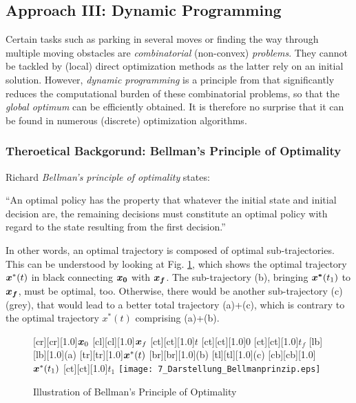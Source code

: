 \subsection{Approach III: Dynamic Programming}\label{S:57.3.3}
Certain tasks such as parking in several moves or finding the way through multiple moving obstacles are \emph{combinatorial} (non-convex) \emph{problems}. They cannot be tackled by (local) direct optimization methods as the latter rely on an initial solution. However, \emph{dynamic programming} is a principle from \cite{bellmann_DP}%
 that significantly reduces the computational burden of these combinatorial problems, so that the \textit{global optimum} can be efficiently obtained. It is therefore no surprise that it can be found in numerous (discrete) optimization algorithms.


\subsubsection{Theroetical Backgorund: Bellman’s Principle of Optimality}\label{S:57.3.3.1}
Richard \emph{Bellman’s principle of optimality} states:

\begin{mydef}
“An optimal policy has the property that whatever the initial state and initial decision are, the remaining decisions must constitute an optimal policy with regard to the state resulting from the first decision.” 
\end{mydef}

In other words, an optimal trajectory is composed of optimal sub-trajectories. This can be understood by looking at Fig. \ref{fig:Darstellung_Bellmanprinzip}, which shows the optimal trajectory $\boldsymbol{x}^* (t)$ in black connecting $\boldsymbol{x_0}$ with $\boldsymbol{x_f}$. The sub-trajectory (b), bringing $\boldsymbol{x^*} (t_1 )$ to $\boldsymbol{x_f}$, must be optimal, too. Otherwise, there would be another sub-trajectory (c) (grey), that would lead to a better total trajectory (a)+(c), which is contrary to the optimal trajectory $x^* (t)$ comprising (a)+(b).

\begin{figure}[h]
	[cr][cr][1.0]{$\boldsymbol{x}_0$}
	[cl][cl][1.0]{$\boldsymbol{x}_f$}
	[ct][ct][1.0]{$t$}
	[ct][ct][1.0]{$0$}
	[ct][ct][1.0]{$t_f$}
	[lb][lb][1.0]{(a)}
	[tr][tr][1.0]{$\boldsymbol{x}^\ast(t)$}
	[br][br][1.0]{(b)}
	[tl][tl][1.0]{(c)}
	[cb][cb][1.0]{$\boldsymbol{x}^\ast(t_1)$}
	[ct][ct][1.0]{$t_1$}
	\centering
 \texttt{[image: 7\_Darstellung\_Bellmanprinzip.eps]}
	\caption[Bellman’s Principle of Optimality]{Illustration of Bellman’s Principle of Optimality} 
	\label{fig:Darstellung_Bellmanprinzip}
\end{figure} 

